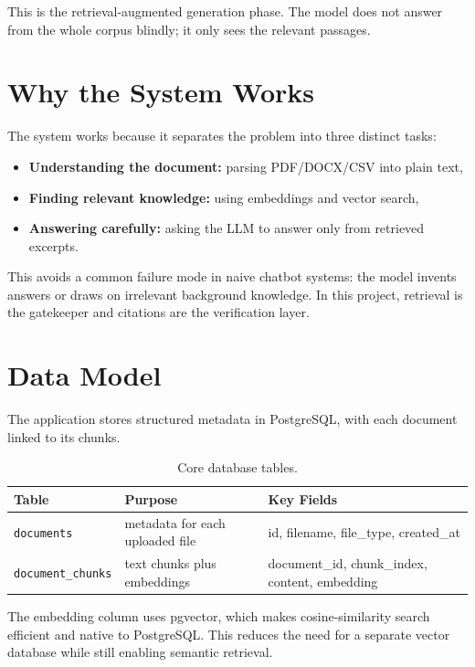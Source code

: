 \documentclass[11pt,a4paper]{article}
\begin{document}
This is the retrieval-augmented generation phase. The model does not answer from the whole corpus blindly; it only sees the relevant passages.

\section{Why the System Works}
The system works because it separates the problem into three distinct tasks:

\begin{itemize}[leftmargin=1.5em]
    \item \textbf{Understanding the document:} parsing PDF/DOCX/CSV into plain text,
    \item \textbf{Finding relevant knowledge:} using embeddings and vector search,
    \item \textbf{Answering carefully:} asking the LLM to answer only from retrieved excerpts.
\end{itemize}

This avoids a common failure mode in naive chatbot systems: the model invents answers or draws on irrelevant background knowledge. In this project, retrieval is the gatekeeper and citations are the verification layer.

\section{Data Model}
The application stores structured metadata in PostgreSQL, with each document linked to its chunks.

\begin{table}[H]
\centering
\renewcommand{\arraystretch}{1.25}
\begin{tabular}{>{\raggedright\arraybackslash}p{2.5cm} >{\raggedright\arraybackslash}p{4cm} >{\raggedright\arraybackslash}p{7cm}}
\toprule
\textbf{Table} & \textbf{Purpose} & \textbf{Key Fields} \\
\midrule
\texttt{documents} & metadata for each uploaded file & id, filename, file\_type, created\_at \\
\texttt{document\_chunks} & text chunks plus embeddings & document\_id, chunk\_index, content, embedding \\
\bottomrule
\end{tabular}
\caption{Core database tables.}
\end{table}

The embedding column uses pgvector, which makes cosine-similarity search efficient and native to PostgreSQL. This reduces the need for a separate vector database while still enabling semantic retrieval.
\end{document}
